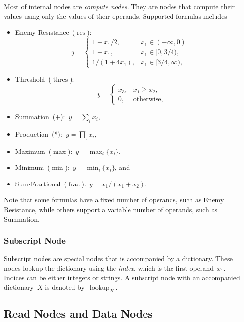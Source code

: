 \documentclass{article}
\DeclareMathOperator{\resNode}{res}
\DeclareMathOperator{\fracNode}{frac}
\DeclareMathOperator{\thresholdNode}{thres}
\DeclareMathOperator{\subscriptNode}{lookup}
\begin{document}
Most of internal nodes are \emph{compute nodes}.
They are nodes that compute their values using only the values of their operands.
Supported formulas includes
%
\begin{itemize}
	\item Enemy Resistance~($\resNode$):
	      \begin{equation*}
		      y = \begin{cases}
			      1 - x_1/2,    & x_1 \in (-\infty, 0),  \\
			      1 - x_1,      & x_1 \in [0, 3/4),      \\
			      1/(1 + 4x_1), & x_1 \in [3/4, \infty),
		      \end{cases}
	      \end{equation*}
	\item Threshold~($\thresholdNode$):
	      \begin{equation*}
		      y = \begin{cases}
			      x_3, & x_1 \ge x_2,      \\
			      0,   & \text{otherwise},
		      \end{cases}
	      \end{equation*}
	\item Summation~($+$):~$y = \sum_i x_i$,
	\item Production~($*$):~$y = \prod_i x_i$,
	\item Maximum~($\max$):~$y = \max_i\{ x_i \}$,
	\item Minimum~($\min$):~$y = \min_i\{ x_i \}$, and
	\item Sum-Fractional~($\fracNode$):~$y = {x_1} / (x_1 + x_2)$.
\end{itemize}
%
Note that some formulas have a fixed number of operands, such as Enemy Resistance, while others support a variable number of operands, such as Summation.

\subsubsection{Subscript Node}

Subscript nodes are special nodes that is accompanied by a dictionary.
These nodes lookup the dictionary using the \emph{index}, which is the first operand~$x_1$.
Indices can be either integers or strings.
A subscript node with an accompanied dictionary~$X$ is denoted by~$\subscriptNode_X$.

\subsection{Read Nodes and Data Nodes}
\end{document}
